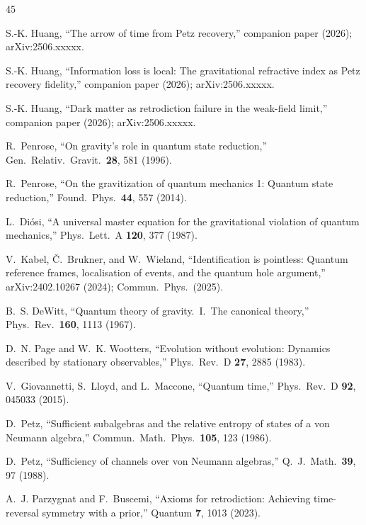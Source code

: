 \documentclass[prl,twocolumn,superscriptaddress,longbibliography,floatfix]{revtex4-2}
\begin{document}
\begin{thebibliography}{45}

S.-K. Huang,
``The arrow of time from Petz recovery,''
companion paper (2026); arXiv:2506.xxxxx.

S.-K. Huang,
``Information loss is local: The gravitational refractive index as
Petz recovery fidelity,''
companion paper (2026); arXiv:2506.xxxxx.

S.-K. Huang,
``Dark matter as retrodiction failure in the weak-field limit,''
companion paper (2026); arXiv:2506.xxxxx.

R.~Penrose,
``On gravity's role in quantum state reduction,''
Gen.\ Relativ.\ Gravit.\ \textbf{28}, 581 (1996).

R.~Penrose,
``On the gravitization of quantum mechanics 1: Quantum state
reduction,''
Found.\ Phys.\ \textbf{44}, 557 (2014).

L.~Di\'{o}si,
``A universal master equation for the gravitational violation of
quantum mechanics,''
Phys.\ Lett.\ A \textbf{120}, 377 (1987).

V.~Kabel, \v{C}.~Brukner, and W.~Wieland,
``Identification is pointless: Quantum reference frames,
localisation of events, and the quantum hole argument,''
arXiv:2402.10267 (2024); Commun.\ Phys.\ (2025).

B.~S. DeWitt,
``Quantum theory of gravity.\ I.\ The canonical theory,''
Phys.\ Rev.\ \textbf{160}, 1113 (1967).

D.~N. Page and W.~K. Wootters,
``Evolution without evolution: Dynamics described by stationary
observables,''
Phys.\ Rev.\ D \textbf{27}, 2885 (1983).

V.~Giovannetti, S.~Lloyd, and L.~Maccone,
``Quantum time,''
Phys.\ Rev.\ D \textbf{92}, 045033 (2015).

D.~Petz,
``Sufficient subalgebras and the relative entropy of states of a
von Neumann algebra,''
Commun.\ Math.\ Phys.\ \textbf{105}, 123 (1986).

D.~Petz,
``Sufficiency of channels over von Neumann algebras,''
Q.\ J.\ Math.\ \textbf{39}, 97 (1988).

A.~J. Parzygnat and F.~Buscemi,
``Axioms for retrodiction: Achieving time-reversal symmetry with a
prior,''
Quantum \textbf{7}, 1013 (2023).


\end{thebibliography}
\end{document}
